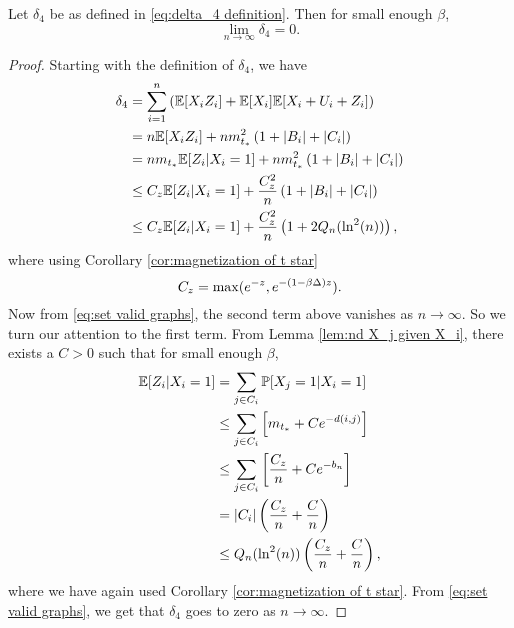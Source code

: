 	\begin{lemma}
	\label{lem:delta4 goes to 0 general}
		Let $\delta_4$ be as defined in \eqref{eq:delta_4 definition}. Then for small enough $\beta$,
		\begin{equation}
			\lim_{n\rightarrow\infty} \delta_4 = 0.
		\end{equation}
	\end{lemma}
	\begin{proof}
		Starting with the definition of $\delta_4$, we have
		\begin{align}
			\delta_4 &= \sum_{i = 1}^n \left(\mathbb{E}[X_i Z_i] + \mathbb{E}[X_i]\mathbb{E}[X_i + U_i + Z_i]\right)\\
				&= n \mathbb{E}[X_i Z_i] + n m_{t_*}^2 \left(1 + |B_i| + |C_i|\right)\\
				&= n m_{t_*} \mathbb{E}[Z_i | X_i = 1] + n m_{t_*}^2 \left(1 + |B_i| + |C_i|\right)\\
				&\leq C_z \mathbb{E}[Z_i | X_i = 1] + \frac{C_z^2}{n} \left(1 + |B_i| + |C_i|\right)\\
				&\leq C_z \mathbb{E}[Z_i | X_i = 1] + \frac{C_z^2}{n} \left(1 + 2 Q_n(\ln^2(n))\right),
		\end{align}
		where using Corollary \ref{cor:magnetization of t star}
		\begin{equation}
			C_z = \max(e^{-z}, e^{-(1 - \beta \Delta)z}).
		\end{equation}
		Now from \eqref{eq:set valid graphs}, the second term above vanishes as $n \rightarrow \infty$. So we turn our attention to the first term. From Lemma \ref{lem:nd X_j given X_i}, there exists a $C > 0$ such that for small enough $\beta$,
		\begin{align}
			\mathbb{E}[Z_i | X_i = 1] &= \sum_{j \in C_i} \mathbb{P}[X_j = 1 | X_i = 1]\\
				&\leq \sum_{j \in C_i} \left[m_{t_*} + C e^{-d(i,j)}\right]\\
				&\leq \sum_{j \in C_i} \left[\frac{C_z}{n} + C e^{-b_n}\right]\\
				&= |C_i| \left(\frac{C_z}{n} + \frac{C}{n}\right)\\
				&\leq Q_n(\ln^2(n)) \left(\frac{C_z}{n} + \frac{C}{n}\right),
		\end{align}
		where we have again used Corollary \ref{cor:magnetization of t star}. From \eqref{eq:set valid graphs}, we get that $\delta_4$ goes to zero as $n \rightarrow \infty$.
	\end{proof}

